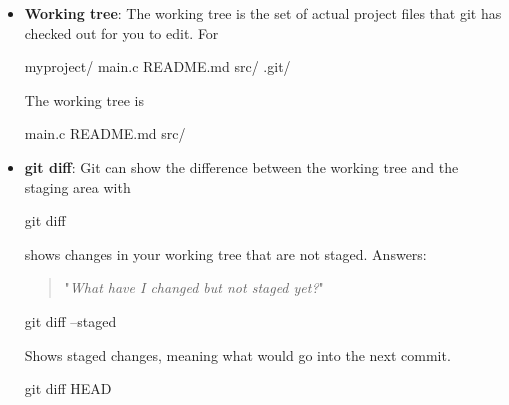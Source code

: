 \documentclass{report}
\begin{document}
\begin{itemize}
\begin{enumerate}
                    And
                    \bigbreak \noindent 
                    \begin{cppcode}
                        git log --graph
                    \end{cppcode}
                \item \textbf{Local repository}: The Git repository stored on your own machine. In a normal project, the local repository is mainly the .git directory
                    \bigbreak \noindent 
                    The .git/ directory contains Git’s internal database: commits, branches, tags, object files, configuration, refs, and the staging area.
            \end{enumerate}
        \item \textbf{Working tree}: The working tree is the set of actual project files that git has checked out for you to edit. For
            \bigbreak \noindent 
            \begin{bashcode}
                myproject/
                main.c
                README.md
                src/
                .git/
            \end{bashcode}
            \bigbreak \noindent 
            The working tree is 
            \bigbreak \noindent 
            \begin{bashcode}
                main.c 
                README.md
                src/
            \end{bashcode}
        \item \textbf{git diff}: Git can show the difference between the working tree and the staging area with
            \bigbreak \noindent 
            \begin{bashcode}
                git diff
            \end{bashcode}
            \bigbreak \noindent 
            shows changes in your working tree that are not staged. Answers: 
            \begin{quote}
                "\textit{What have I changed but not staged yet?}"
            \end{quote}
            \bigbreak \noindent 
            \begin{bashcode}
                git diff --staged
            \end{bashcode}
            \bigbreak \noindent 
            Shows staged changes, meaning what would go into the next commit.
            \bigbreak \noindent 
            \begin{bashcode}
                git diff HEAD
            \end{bashcode}

\end{itemize}
\end{document}
